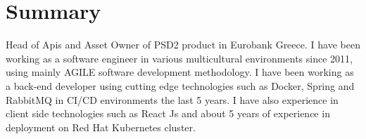 \documentclass[letterpaper]{style/twentysecondcv} %
\begin{document}








\makeprofile %


\section{Summary}

Head of Apis and Asset Owner of PSD2 product in  Eurobank Greece. 
I have been working as a software engineer in various multicultural environments since 2011, using mainly AGILE software development methodology. 
I have been working as a back-end developer using cutting edge technologies such as Docker, Spring and RabbitMQ in CI/CD environments the last 5 years. 
I have also experience in client side technologies such as React Js and about 5 years of experience in deployment on Red Hat Kubernetes cluster.

\vspace{1.4em}
\end{document}
